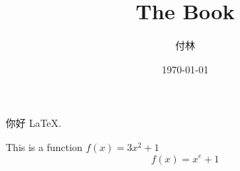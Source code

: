 \documentclass{report}%
\title{\heiti The Book}
\author{\kaishu 付林}
\date{\today}
\begin{document}
	\maketitle
	你好 \LaTeX.

	This is a function $f(x) = 3x^2 + 1$
	$$f(x) = x^e + 1$$
\end{document}
